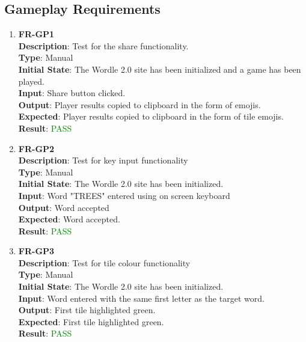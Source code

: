 \documentclass[12pt, titlepage]{article}
\begin{document}
\subsection{Gameplay Requirements}
\begin{enumerate} 
	\item \textbf{FR-GP1\\}
	\textbf{Description}: Test for the share functionality.\\
	\textbf{Type}: Manual\\
	\textbf{Initial State}: The Wordle 2.0 site has been initialized and a game has been played.\\
	\textbf{Input}: Share button clicked.\\
	\textbf{Output}: Player results copied to clipboard in the form of emojis. \\
	\textbf{Expected}: Player results copied to clipboard in the form of tile emojis.\\
	\textbf{Result}: \textcolor{green}{PASS}\\
	
	\item \textbf{FR-GP2\\}
	\textbf{Description}: Test for key input functionality\\
	\textbf{Type}: Manual\\
	\textbf{Initial State}: The Wordle 2.0 site has been initialized.\\
	\textbf{Input}: Word "TREES" entered using on screen keyboard\\
	\textbf{Output}: Word accepted\\
	\textbf{Expected}: Word accepted.\\
	\textbf{Result}: \textcolor{green}{PASS}\\
	
	\item \textbf{FR-GP3\\}
	\textbf{Description}: Test for tile colour functionality\\
	\textbf{Type}: Manual\\
	\textbf{Initial State}: The Wordle 2.0 site has been initialized.\\
	\textbf{Input}: Word entered with the same first letter as the target word.\\
	\textbf{Output}: First tile highlighted green. \\
	\textbf{Expected}: First tile highlighted green.\\
	\textbf{Result}: \textcolor{green}{PASS}\\
	

\end{enumerate}
\end{document}
